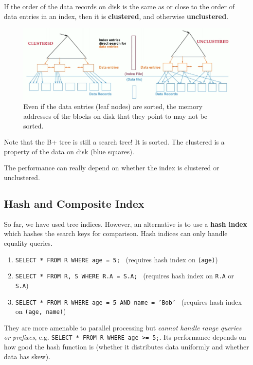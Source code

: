     \begin{definition}
      If the order of the data records on disk is the same as or close to the order of data entries in an index, then it is \textbf{clustered}, and otherwise \textbf{unclustered}. 

      \begin{figure}[H]
        \centering 
        \includegraphics[scale=0.4]{img/clustered_vs_unclustered.png}
        \caption{Even if the data entries (leaf nodes) are sorted, the memory addresses of the blocks on disk that they point to may not be sorted.} 
        \label{fig:clustered_vs_unclustered}
      \end{figure}

      Note that the B+ tree is still a search tree! It is sorted. The clustered is a property of the data on disk (blue squares). 
    \end{definition}

    The performance can really depend on whether the index is clustered or unclustered. 

\subsection{Hash and Composite Index}

  \begin{definition}
    So far, we have used tree indices. However, an alternative is to use a \textbf{hash index} which hashes the search keys for comparison. Hash indices can only handle equality queries. 
    \begin{enumerate}
      \item \texttt{SELECT * FROM R WHERE age = 5; } (requires hash index on \texttt{(age)})
      \item \texttt{SELECT * FROM R, S WHERE R.A = S.A; } (requires hash index on \texttt{R.A} or \texttt{S.A})
      \item \texttt{SELECT * FROM R WHERE age = 5 AND name = 'Bob' } (requires hash index on \texttt{(age, name)})
    \end{enumerate}
    They are more amenable to parallel processing but \textit{cannot handle range queries or prefixes}, e.g. \texttt{SELECT * FROM R WHERE age >= 5;}. Its performance depends on how good the hash function is (whether it distributes data uniformly and whether data has skew). 
  \end{definition}

